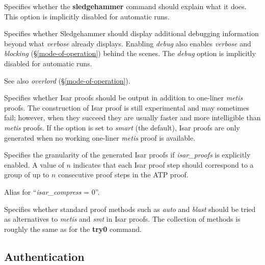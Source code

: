 \documentclass[a4paper,12pt]{article}
\begin{document}
\begin{enum}

Specifies whether the \textbf{sledgehammer} command should explain what it does.
This option is implicitly disabled for automatic runs.

Specifies whether Sledgehammer should display additional debugging information
beyond what \textit{verbose} already displays. Enabling \textit{debug} also
enables \textit{verbose} and \textit{blocking} (\S\ref{mode-of-operation})
behind the scenes. The \textit{debug} option is implicitly disabled for
automatic runs.

\nopagebreak
{\small See also \textit{overlord} (\S\ref{mode-of-operation}).}

Specifies whether Isar proofs should be output in addition to one-liner
\textit{metis} proofs. The construction of Isar proof is still experimental and
may sometimes fail; however, when they succeed they are usually faster and more
intelligible than \textit{metis} proofs. If the option is set to \textit{smart}
(the default), Isar proofs are only generated when no working one-liner
\textit{metis} proof is available.

Specifies the granularity of the generated Isar proofs if \textit{isar\_proofs}
is explicitly enabled. A value of $n$ indicates that each Isar proof step should
correspond to a group of up to $n$ consecutive proof steps in the ATP proof.

Alias for ``\textit{isar\_compress} = 0''.

Specifies whether standard proof methods such as \textit{auto} and
\textit{blast} should be tried as alternatives to \textit{metis} and
\textit{smt} in Isar proofs. The collection of methods is roughly the same as
for the \textbf{try0} command.
\end{enum}

\subsection{Authentication}
\label{authentication}
\end{document}
